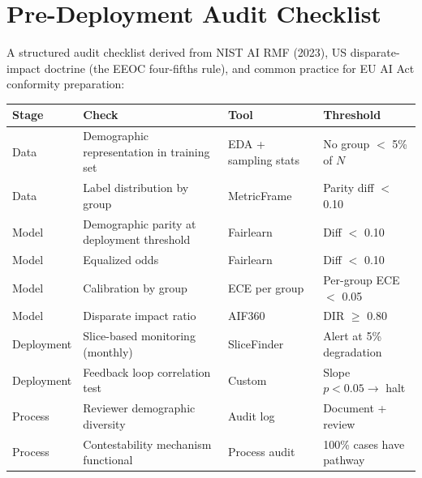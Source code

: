 \section{Pre-Deployment Audit Checklist}
\label{sec:a14-checklist}

A structured audit checklist derived from NIST AI RMF (2023), US disparate-impact doctrine (the EEOC four-fifths rule), and common practice for EU AI Act conformity preparation:

\begin{center}
\small
\begin{tabularx}{\textwidth}{@{}lYlY@{}}
\toprule
\textbf{Stage} & \textbf{Check} & \textbf{Tool} & \textbf{Threshold} \\
\midrule
Data       & Demographic representation in training set & EDA + sampling stats  & No group $<$ 5\% of $N$ \\
Data       & Label distribution by group                & MetricFrame           & Parity diff $<$ 0.10 \\
Model      & Demographic parity at deployment threshold & Fairlearn             & Diff $<$ 0.10 \\
Model      & Equalized odds                             & Fairlearn             & Diff $<$ 0.10 \\
Model      & Calibration by group                       & ECE per group         & Per-group ECE $<$ 0.05 \\
Model      & Disparate impact ratio                     & AIF360                & DIR $\geq$ 0.80 \\
Deployment & Slice-based monitoring (monthly)           & SliceFinder           & Alert at 5\% degradation \\
Deployment & Feedback loop correlation test             & Custom                & Slope $p < 0.05 \to$ halt \\
Process    & Reviewer demographic diversity             & Audit log             & Document + review \\
Process    & Contestability mechanism functional        & Process audit         & 100\% cases have pathway \\
\bottomrule
\end{tabularx}
\end{center}

